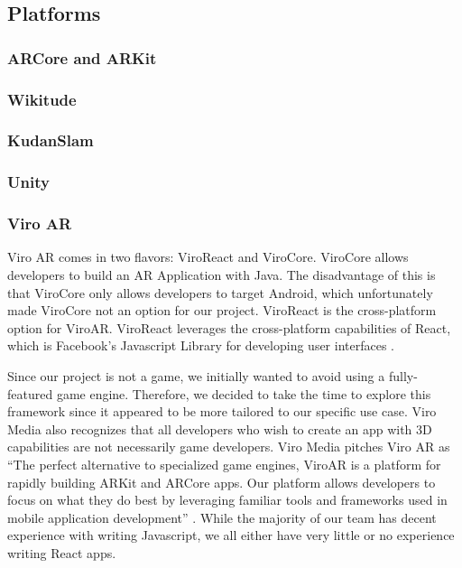 \documentclass[a4paper, 10pt, american]{article}
\begin{document}
\lipsum[4-5]

\subsection{Platforms}
\label{sec:platforms}

\subsubsection{ARCore and ARKit}
\label{sec:ARCoreAndARKit}

\subsubsection{Wikitude}
\label{sec:wikitude}

\subsubsection{KudanSlam}
\label{sec:kudanSlam}

\subsubsection{Unity}
\label{sec:unity}

\subsubsection{Viro AR}
\label{sec:viroReact}

Viro AR comes in two flavors: ViroReact and ViroCore. ViroCore allows
developers to build an AR Application with Java. The disadvantage of this is
that ViroCore only allows developers to target Android, which unfortunately
made ViroCore not an option for our project. ViroReact is the cross-platform
option for ViroAR. ViroReact leverages the cross-platform capabilities of
React, which is Facebook's Javascript Library for developing user interfaces
\autocite{facebook2019}.

Since our project is not a game, we initially wanted to avoid using a
fully-featured game engine. Therefore, we decided to take the time to explore
this framework since it appeared to be more tailored to our specific use case.
Viro Media also recognizes that all developers who wish to create an app with
3D capabilities are not necessarily game developers. Viro Media pitches Viro
AR as ``The perfect alternative to specialized game engines, ViroAR is a
platform for rapidly building ARKit and ARCore apps. Our platform allows
developers to focus on what they do best by leveraging familiar tools and
frameworks used in mobile application development'' \autocite{viro2019}.
While the majority of our team has decent experience with writing Javascript,
we all either have very little or no experience writing React apps.
\end{document}
